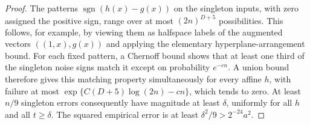 \begin{proof}
The patterns $\operatorname{sgn}(h(x)-g(x))$ on the singleton inputs, with zero assigned the positive sign, range over at most $(2n)^{D+5}$ possibilities. This follows, for example, by viewing them as halfspace labels of the augmented vectors $((1,x),g(x))$ and applying the elementary hyperplane-arrangement bound. For each fixed pattern, a Chernoff bound shows that at least one third of the singleton noise signs match it except on probability $e^{-c n}$. A union bound therefore gives this matching property simultaneously for every affine $h$, with failure at most $\exp\{C(D+5)\log(2n)-c n\}$, which tends to zero. At least $n/9$ singleton errors consequently have magnitude at least $\delta$, uniformly for all $h$ and all $t\ge\delta$. The squared empirical error is at least $\delta^2/9>2^{-24}a^2$.
\end{proof}

